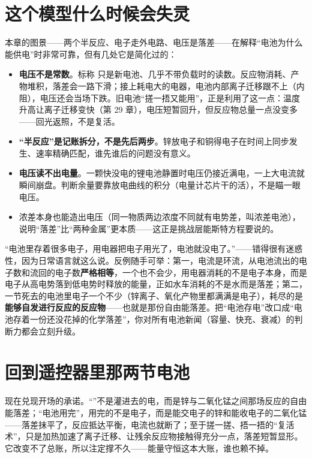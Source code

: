 \section{这个模型什么时候会失灵}

本章的图景——两个半反应、电子走外电路、电压是落差——在解释“电池为什么能供电”时非常可靠，但有几处它是简化过的：

\begin{itemize}[itemsep=2pt]
\item \textbf{电压不是常数}。标称  只是新电池、几乎不带负载时的读数。反应物消耗、产物堆积，落差会一路下滑；接上耗电大的电器，电池内部离子迁移跟不上（内阻），电压还会当场下跌。旧电池“搓一捂又能用”，正是利用了这一点：温度升高让离子迁移变快（第 29 章），电压短暂回升，但反应物总量一点没变多——回光返照，不是复活。
\item \textbf{“半反应”是记账拆分，不是先后两步}。锌放电子和铜得电子在时间上同步发生、速率精确匹配，谁先谁后的问题没有意义。
\item \textbf{电压读不出电量}。一颗快没电的锂电池静置时电压仍接近满电，一上大电流就瞬间崩盘。判断余量要靠放电曲线的积分（电量计芯片干的活），不是瞄一眼电压。
\item 浓差本身也能造出电压（同一物质两边浓度不同就有电势差，叫浓差电池），说明“落差”比“两种金属”更本质——这正是挑战层能斯特方程要说的。
\end{itemize}

\begin{wuqu}
“电池里存着很多电子，用电器把电子用光了，电池就没电了。”——错得很有迷惑性，因为日常语言就这么说。反例随手可举：第一，电流是环流，从电池流出的电子数和流回的电子数\textbf{严格相等}，一个也不会少，用电器消耗的不是电子本身，而是电子从高电势落到低电势时释放的能量，正如水车消耗的不是水而是落差；第二，一节死去的电池里电子一个不少（锌离子、氧化产物里都满满是电子），耗尽的是\textbf{能够自发进行反应的反应物}——也就是那份自由能落差。把“电池存电”改口成“电池存着一份还没花掉的化学落差”，你对所有电池新闻（容量、快充、衰减）的判断力都会立刻升级。
\end{wuqu}

\section{回到遥控器里那两节电池}

现在兑现开场的承诺。“”不是灌进去的电，而是锌与二氧化锰之间那场反应的自由能落差；“电池用完”，用完的不是电子，而是能交电子的锌和能收电子的二氧化锰——落差抹平了，反应抵达平衡，电流也就断了；至于搓一搓、捂一捂的“复活术”，只是加热加速了离子迁移、让残余反应物接触得充分一点，落差短暂显形。它改变不了总账，所以注定撑不久——能量守恒这本大账，谁也赖不掉。

